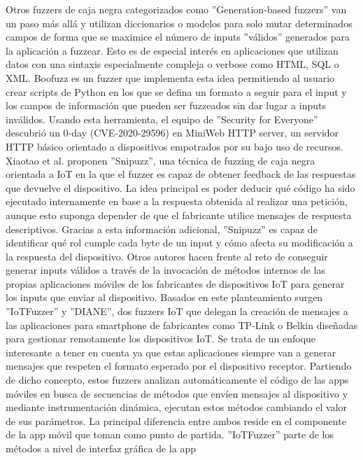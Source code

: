 Otros fuzzers de caja negra categorizados como ''Generation-based fuzzers''\cite{Felderer2016} van un paso más allá y utilizan diccionarios o modelos para solo 
mutar determinados campos de forma que se maximice el número de inputs ''válidos'' generados para la aplicación a fuzzear. Esto es de 
especial interés en aplicaciones que utilizan datos con una sintaxis especialmente compleja o verbose como HTML, SQL o XML.
Boofuzz\cite{boofuzz} es un fuzzer que implementa esta idea permitiendo al usuario crear scripts de Python en los que 
se defina un formato a seguir para el input y los campos de información que pueden ser fuzzeados sin dar lugar a inputs 
inválidos. Usando esta herramienta, el equipo de ''Security for Everyone'' descubrió un 0-day (CVE-2020-29596)\cite{securityforeveryone}
en MiniWeb HTTP server, un servidor HTTP básico orientado a dispositivos empotrados por su bajo uso de recursos.
Xiaotao et al.\cite{snipuzz} proponen ''Snipuzz'', una técnica de fuzzing de caja negra orientada a IoT en la que el fuzzer es capaz de obtener feedback 
de las respuestas que devuelve el dispositivo. La idea principal es poder deducir qué código ha sido ejecutado internamente en base a 
la respuesta obtenida al realizar una petición, aunque esto suponga depender de que el fabricante utilice mensajes de respuesta descriptivos.
Gracias a esta información adicional, ''Snipuzz'' es capaz de identificar qué rol cumple cada 
byte de un input y cómo afecta su modificación a la respuesta del dispositivo. Otros autores hacen frente al reto de conseguir generar inputs 
válidos a través de la invocación de métodos internos de las propias aplicaciones móviles de los fabricantes de dispositivos IoT para generar los 
inputs que enviar al dispositivo.
Basados en este planteamiento surgen ''IoTFuzzer''\cite{Chen2018} y ''DIANE''\cite{Redini2021}, dos fuzzers IoT que delegan la creación de mensajes 
a las aplicaciones para smartphone de fabricantes como TP-Link o Belkin diseñadas para gestionar remotamente los dispositivos IoT. 
Se trata de un enfoque interesante a tener en cuenta ya que estas aplicaciones siempre van a generar mensajes que respeten el formato esperado
por el dispositivo receptor. Partiendo de dicho concepto, estos fuzzers analizan automáticamente el código de las apps móviles en busca de secuencias de 
métodos que envíen mensajes al dispositivo y mediante instrumentación dinámica, ejecutan estos métodos cambiando el valor de sus parámetros. La principal diferencia 
entre ambos reside en el componente de la app móvil que toman como punto de partida. ''IoTFuzzer'' parte de los métodos a nivel de interfaz gráfica de la app
